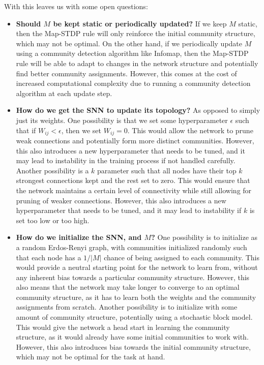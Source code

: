 \documentclass[pdflatex,sn-mathphys-num]{sn-jnl}%
\theoremstyle{thmstyleone}%
\theoremstyle{thmstyletwo}%
\theoremstyle{thmstylethree}%
\begin{document}
With this leaves us with some open questions:

\begin{itemize}
    \item \textbf{Should $M$ be kept static or periodically updated?} If we keep $M$ static, then the Map-STDP rule will only reinforce the initial community structure, which may not be optimal. On the other hand, if we periodically update $M$ using a community detection algorithm like Infomap, then the Map-STDP rule will be able to adapt to changes in the network structure and potentially find better community assignments. However, this comes at the cost of increased computational complexity due to running a community detection algorithm at each update step.
    \item \textbf{How do we get the SNN to update its topology?} As opposed to simply just its weights. One possibility is that we set some hyperparameter $\epsilon$ such that if $W_{ij} < \epsilon$, then we set $W_{ij} = 0$. This would allow the network to prune weak connections and potentially form more distinct communities. However, this also introduces a new hyperparameter that needs to be tuned, and it may lead to instability in the training process if not handled carefully. Another possibility is a $k$ parameter such that all nodes have their top $k$ strongest connections kept and the rest set to zero. This would ensure that the network maintains a certain level of connectivity while still allowing for pruning of weaker connections. However, this also introduces a new hyperparameter that needs to be tuned, and it may lead to instability if $k$ is set too low or too high.
    \item \textbf{How do we initialize the SNN, and $M$?} One possibility is to initialize as a random Erdos-Renyi graph, with communities initialized randomly such that each node has a $1/|M|$ chance of being assigned to each community. This would provide a neutral starting point for the network to learn from, without any inherent bias towards a particular community structure. However, this also means that the network may take longer to converge to an optimal community structure, as it has to learn both the weights and the community assignments from scratch. Another possibility is to initialize with some amount of community structure, potentially using a stochastic block model. This would give the network a head start in learning the community structure, as it would already have some initial communities to work with. However, this also introduces bias towards the initial community structure, which may not be optimal for the task at hand.
\end{itemize}
\end{document}
